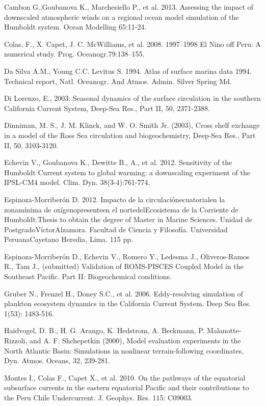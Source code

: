 Cambon G.,Goubanova K., Marchesiello P., et al. 2013. Assessing the impact of downscaled atmospheric winds on a regional ocean model simulation of the Humboldt system. Ocean Modelling 65:11-24.

Colas, F., X. Capet, J. C. McWilliams, et al. 2008. 1997–1998 El Nino off Peru: A numerical study. Prog. Oceanogr.79:138–155.

Da Silva A.M., Young C.C. Levitus S. 1994. Atlas of surface marina data 1994. Technical report, Natl. Oceanogr. And Atmos. Admin. Silver Spring Md.

Di Lorenzo, E., 2003: Seasonal dynamics of the surface circulation in the southern California Current System, Deep-Sea Res., Part II, 50, 2371-2388.

Dinniman, M. S., J. M. Klinck, and W. O. Smith Jr. (2003), Cross shelf exchange in a model of the Ross Sea circulation and biogeochemistry, Deep-Sea Res., Part II, 50, 3103-3120.

Echevin V., Goubanova K., Dewitte B., A., et al. 2012. Sensitivity of the Humboldt Current system to global warming: a downscaling experiment of the IPSL-CM4 model. Clim. Dyn. 38(3-4):761-774.

Espinoza-Morriberón D. 2012. Impacto de la circulaciónecuatorialen la zonamínima de oxígenopresenteen el nortedelEcosistema de la Corriente de Humboldt.Thesis to obtain the degree of Master in Marine Sciences. Unidad de PostgradoVíctorAlzamora. Facultad de Ciencia y Filosofía. Universidad PeruanaCayetano Heredia, Lima. 115 pp.

Espinoza-Morriberón D., Echevin V., Romero Y.,  Ledesma J., Oliveros-Ramos R., Tam J., (submitted) Validation of ROMS-PISCES Coupled Model in the Southeast Pacific. Part II: Biogeochemical conditions.

Gruber N., Frenzel H., Doney S.C., et al. 2006. Eddy-resolving simulation of plankton ecosystem dynamics in the California Current System. Deep Sea Res. 1(53): 1483-516.

Haidvogel, D. B., H. G. Arango, K. Hedstrom, A. Beckmann, P. Malanotte-Rizzoli, and A. F. Shchepetkin (2000), Model evaluation experiments in the North Atlantic Basin: Simulations in nonlinear terrain-following coordinates, Dyn. Atmos. Oceans, 32, 239-281.

Montes I., Colas F., Capet X., et al. 2010. On the pathways of the equatorial subsurface currents in the eastern equatorial Pacific and their contributions to the Peru Chile Undercurrent. J. Geophys. Res. 115: C09003.

